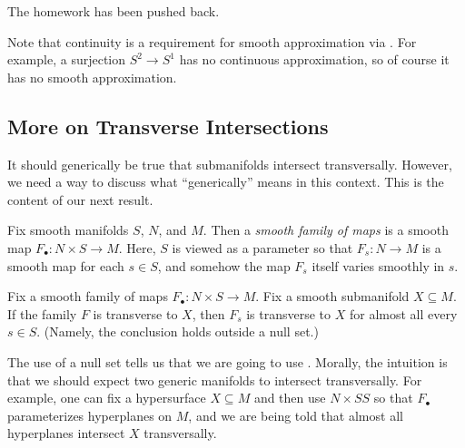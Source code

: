 \documentclass[../notes.tex]{subfiles}
\begin{document}
The homework has been pushed back.
\begin{remark}
	Note that continuity is a requirement for smooth approximation via . For example, a surjection $S^2\to S^1$ has no continuous approximation, so of course it has no smooth approximation.
\end{remark}

\subsection{More on Transverse Intersections}
It should generically be true that submanifolds intersect transversally. However, we need a way to discuss what ``generically'' means in this context. This is the content of our next result.
\begin{definition}
	Fix smooth manifolds $S$, $N$, and $M$. Then a \textit{smooth family of maps} is a smooth map $F_\bullet\colon N\times S\to M$. Here, $S$ is viewed as a parameter so that $F_s\colon N\to M$ is a smooth map for each $s\in S$, and somehow the map $F_s$ itself varies smoothly in $s$.
\end{definition}
\begin{proposition} \label{prop:parametric-transversality}
	Fix a smooth family of maps $F_\bullet\colon N\times S\to M$. Fix a smooth submanifold $X\subseteq M$. If the family $F$ is transverse to $X$, then $F_s$ is transverse to $X$ for almost all every $s\in S$. (Namely, the conclusion holds outside a null set.)
\end{proposition}
The use of a null set tells us that we are going to use . Morally, the intuition is that we should expect two generic manifolds to intersect transversally. For example, one can fix a hypersurface $X\subseteq M$ and then use $N\times SS$ so that $F_\bullet$ parameterizes hyperplanes on $M$, and we are being told that almost all hyperplanes intersect $X$ transversally.
\end{document}
